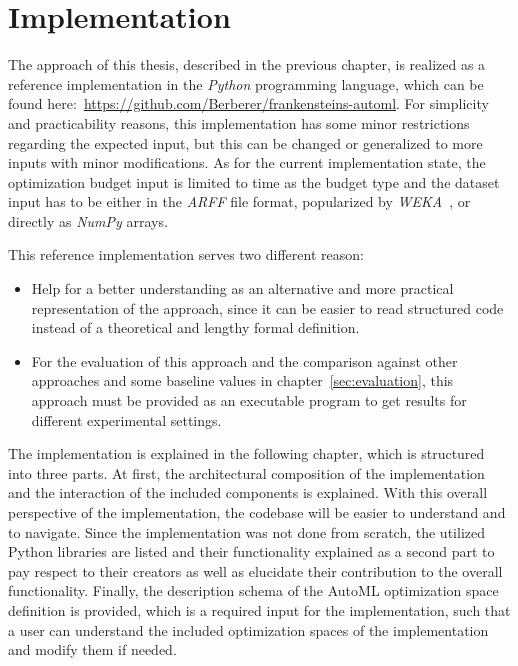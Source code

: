 %
\chapter{Implementation}
\label{sec:implementation}
The approach of this thesis, described in the previous chapter, is realized as a reference implementation in the \textit{Python} programming language, which can be found here:~\url{https://github.com/Berberer/frankensteins-automl}.
For simplicity and practicability reasons, this implementation has some minor restrictions regarding the expected input, but this can be changed or generalized to more inputs with minor modifications.
As for the current implementation state, the optimization budget input is limited to time as the budget type and the dataset input has to be either in the \textit{ARFF} file format, popularized by \textit{WEKA}~\cite{Witten-Weka}, or directly as \textit{NumPy} arrays.

This reference implementation serves two different reason:
\begin{itemize}
	\item Help for a better understanding as an alternative and more practical representation of the approach, since it can be easier to read structured code instead of a theoretical and lengthy formal definition.
	\item For the evaluation of this approach and the comparison against other approaches and some baseline values in chapter~\ref{sec:evaluation}, this approach must be provided as an executable program to get results for different experimental settings.
\end{itemize}

The implementation is explained in the following chapter, which is structured into three parts.
At first, the architectural composition of the implementation and the interaction of the included components is explained.
With this overall perspective of the implementation, the codebase will be easier to understand and to navigate.
Since the implementation was not done from scratch, the utilized Python libraries are listed and their functionality explained as a second part to pay respect to their creators as well as elucidate their contribution to the overall functionality.
Finally, the description schema of the AutoML optimization space definition is provided, which is a required input for the implementation, such that a user can understand the included optimization spaces of the implementation and modify them if needed.


